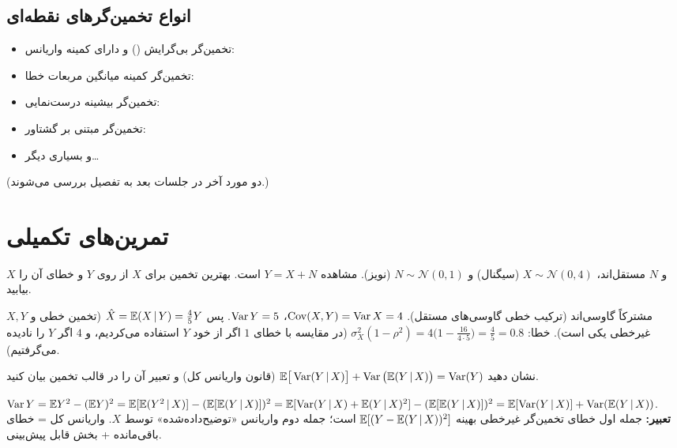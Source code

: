\subsection{انواع تخمین‌گرهای نقطه‌ای}
\begin{itemize}
\item تخمین‌گر بی‌گرایش () و دارای کمینه واریانس:\\ 
\item تخمین‌گر کمینه میانگین مربعات خطا:\\ 
\item تخمین‌گر بیشینه درست‌نمایی:\\ 
\item تخمین‌گر مبتنی بر گشتاور:\\ 
\item و بسیاری دیگر\ldots
\end{itemize}
(دو مورد آخر در جلسات بعد به تفصیل بررسی می‌شوند.)

\section{تمرین‌های تکمیلی}

\begin{exercise}
$X$ و $N$ مستقل‌اند، $X\sim\mathcal N(0,4)$ (سیگنال) و $N\sim\mathcal N(0,1)$ (نویز). مشاهده $Y=X+N$ است. بهترین تخمین  برای $X$ از روی $Y$ و خطای آن را بیابید.
\end{exercise}
\begin{solution}
$X,Y$ مشترکاً گاوسی‌اند (ترکیب خطی گاوسی‌های مستقل). $\operatorname{Cov}(X,Y)=\operatorname{Var} X=4$، $\operatorname{Var} Y=5$. پس $\hat X=\mathbb{E}(X\,|\, Y)=\frac45Y$ (تخمین خطی و غیرخطی یکی است). خطا: $\sigma_X^2(1-\rho^2)=4\big(1-\frac{16}{4\cdot5}\big)=\frac45=0.8$ (در مقایسه با خطای $1$ اگر از خود $Y$ استفاده می‌کردیم، و $4$ اگر $Y$ را نادیده می‌گرفتیم).
\end{solution}

\begin{exercise}
نشان دهید $\mathbb{E}\big[\operatorname{Var}(Y\,|\, X)\big]+\operatorname{Var}\big(\mathbb{E}(Y\,|\, X)\big)=\operatorname{Var}(Y)$ (قانون واریانس کل) و تعبیر آن را در قالب تخمین  بیان کنید.
\end{exercise}
\begin{solution}
$\operatorname{Var} Y=\mathbb{E} Y^2-(\mathbb{E} Y)^2=\mathbb{E}[\mathbb{E}(Y^2\,|\, X)]-(\mathbb{E}[\mathbb{E}(Y\,|\, X)])^2=\mathbb{E}[\operatorname{Var}(Y\,|\, X)+\mathbb{E}(Y\,|\, X)^2]-(\mathbb{E}[\mathbb{E}(Y\,|\, X)])^2=\mathbb{E}[\operatorname{Var}(Y\,|\, X)]+\operatorname{Var}(\mathbb{E}(Y\,|\, X))$.
\textbf{تعبیر:} جمله اول خطای تخمین‌گر غیرخطی بهینه $\mathbb{E}[(Y-\mathbb{E}(Y\,|\, X))^2]$ است؛ جمله دوم واریانس «توضیح‌داده‌شده» توسط $X$. واریانس کل = خطای باقی‌مانده + بخش قابل پیش‌بینی.
\end{solution}

